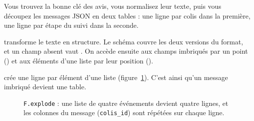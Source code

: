 Vous trouvez la bonne clé des avis, vous normalisez leur texte, puis vous découpez les messages JSON
en deux tables : une ligne par colis dans la première, une ligne par étape du suivi dans la seconde.

\begin{notion}
 transforme le texte
en structure. Le schéma couvre les deux versions du format, et un champ absent vaut . On
accède ensuite aux champs imbriqués par un point () et aux éléments d'une liste
par leur position ().
\end{notion}

\begin{notion}
 crée une ligne par élément d'une liste
(figure~\ref{c4:fig:explode}). C'est ainsi qu'un message imbriqué devient une table.
\end{notion}

\begin{figure}[H]
\centering
{}
\caption{\texttt{F.explode} : une liste de quatre événements devient quatre lignes, et les colonnes du
message (\texttt{colis\_id}) sont répétées sur chaque ligne.}
\label{c4:fig:explode}
\end{figure}

